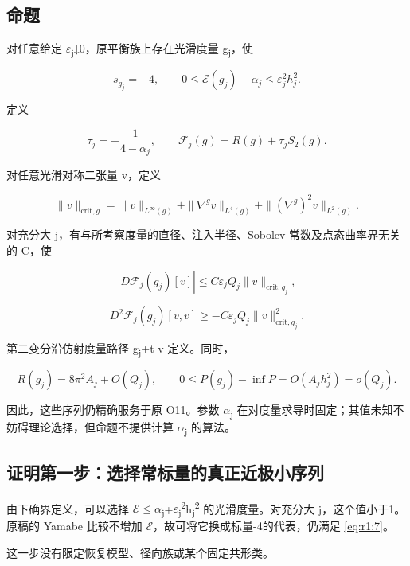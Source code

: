 \documentclass[UTF8,11pt,fontset=none]{ctexart}
\begin{document}
\subsection{命题}\label{ch1:ux547dux9898-1}

对任意给定 \(\varepsilon\)\textsubscript{j}↓0，原平衡族上存在光滑度量 g\textsubscript{j}，使

\[
s_{g_j}=-4,\qquad
0\le\mathcal E(g_j)-\alpha_j\le\varepsilon_j^2 h_j^2.
\tag{1.7}\label{eq:r1:7}
\]

定义

\[
\tau_j=-\frac1{4-\alpha_j},\qquad
\mathscr F_j(g)=R(g)+\tau_jS_2(g).
\tag{1.8}\label{eq:r1:8}
\]

对任意光滑对称二张量 v，定义

\[
\|v\|_{\mathrm{crit},g}
=\|v\|_{L^\infty(g)}
+\|\nabla^g v\|_{L^4(g)}
+\|(\nabla^g)^2v\|_{L^2(g)}.
\tag{1.9}\label{eq:r1:9}
\]

对充分大 j，有与所考察度量的直径、注入半径、Sobolev 常数及点态曲率界无关的 C，使

\[
\boxed{|D\mathscr F_j(g_j)[v]|
\le C\varepsilon_jQ_j\|v\|_{\mathrm{crit},g_j},}
\tag{1.10}\label{eq:r1:10}
\]

\[
\boxed{D^2\mathscr F_j(g_j)[v,v]
\ge-C\varepsilon_jQ_j\|v\|_{\mathrm{crit},g_j}^2.}
\tag{1.11}\label{eq:r1:11}
\]

第二变分沿仿射度量路径 g\textsubscript{j}+t v 定义。同时，

\[
R(g_j)=8\pi^2A_j+O(Q_j),\qquad
0\le P(g_j)-\inf P=O(A_jh_j^2)=o(Q_j).
\tag{1.12}\label{eq:r1:12}
\]

因此，这些序列仍精确服务于原 O11。参数 \(\alpha\)\textsubscript{j} 在对度量求导时固定；其值未知不妨碍理论选择，但命题不提供计算 \(\alpha\)\textsubscript{j} 的算法。

\subsection{证明第一步：选择常标量的真正近极小序列}\label{ch1:ux8bc1ux660eux7b2cux4e00ux6b65ux9009ux62e9ux5e38ux6807ux91cfux7684ux771fux6b63ux8fd1ux6781ux5c0fux5e8fux5217}

由下确界定义，可以选择 \(\mathcal E\)\(\le\)\(\alpha\)\textsubscript{j}+\(\varepsilon\)\textsubscript{j}\textsuperscript{2}h\textsubscript{j}\textsuperscript{2} 的光滑度量。对充分大 j，这个值小于1。原稿的 Yamabe 比较不增加 \(\mathcal E\)，故可将它换成标量-4的代表，仍满足 \eqref{eq:r1:7}。

这一步没有限定恢复模型、径向族或某个固定共形类。
\end{document}
